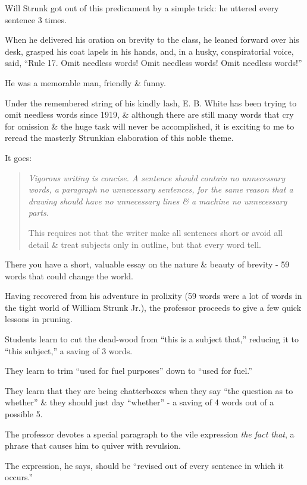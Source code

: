 \documentclass{article}
\begin{document}
Will Strunk got out of this predicament by a simple trick: he uttered every sentence 3 times.

When he delivered his oration on brevity to the class, he leaned forward over his desk, grasped his coat lapels in his hands, and, in a husky, conspiratorial voice, said, ``Rule 17. Omit needless words! Omit needless words! Omit needless words!''

%
He was a memorable man, friendly \& funny.

Under the remembered string of his kindly lash, E. B. White has been trying to omit needless words since 1919, \& although there are still many words that cry for omission \& the huge task will never be accomplished, it is exciting to me to reread the masterly Strunkian elaboration of this noble theme.

It goes:

\begin{quotation}
	\it
	Vigorous writing is concise. A sentence should contain no unnecessary words, a paragraph no unnecessary sentences, for the same reason that a drawing should have no unnecessary lines \& a machine no unnecessary parts.
	
	This requires not that the writer make all sentences short or avoid all detail \& treat subjects only in outline, but that every word tell.
\end{quotation}
There you have a short, valuable essay on the nature \& beauty of brevity - 59 words that could change the world.

Having recovered from his adventure in prolixity (59 words were a lot of words in the tight world of William Strunk Jr.), the professor proceeds to give a few quick lessons in pruning.

Students learn to cut the dead-wood from ``this is a subject that,'' reducing it to ``this subject,'' a saving of 3 words.

They learn to trim ``used for fuel purposes'' down to ``used for fuel.''

They learn that they are being chatterboxes when they say ``the question as to whether'' \& they should just day ``whether'' - a saving of 4 words out of a possible 5.

%
The professor devotes a special paragraph to the vile expression {\it the fact that}, a phrase that causes him to quiver with revulsion.

The expression, he says, should be ``revised out of every sentence in which it occurs.''
\end{document}
